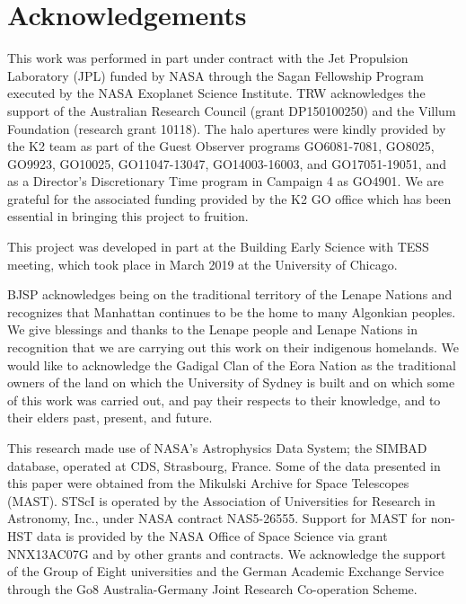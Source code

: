 \documentclass[modern]{aastex62}
\begin{document}
\section*{Acknowledgements} %

This work was performed in part under contract with the Jet Propulsion Laboratory (JPL) funded by NASA through the Sagan Fellowship Program executed by the NASA Exoplanet Science Institute. TRW acknowledges the support of the Australian Research Council (grant DP150100250) and the Villum Foundation (research grant 10118). The halo apertures were kindly provided by the K2 team as part of the Guest Observer programs GO6081-7081, GO8025, GO9923, GO10025, GO11047-13047, GO14003-16003, and GO17051-19051, and as a Director's Discretionary Time program in Campaign 4 as GO4901. We are grateful for the associated funding provided by the K2 GO office which has been essential in bringing this project to fruition.

This project was developed in part at the Building Early Science with TESS meeting, which took place in March 2019 at the University of Chicago.

BJSP acknowledges being on the traditional territory of the Lenape Nations and recognizes that Manhattan continues to be the home to many Algonkian peoples. We give blessings and thanks to the Lenape people and Lenape Nations in recognition that we are carrying out this work on their indigenous homelands. We would like to acknowledge the Gadigal Clan of the Eora Nation as the traditional owners of the land on which the University of Sydney is built and on which some of this work was carried out, and pay their respects to their knowledge, and to their elders past, present, and future.
%

This research made use of NASA's Astrophysics Data System; the SIMBAD database, operated at CDS, Strasbourg, France. Some of the data presented in this paper were obtained from the Mikulski Archive for Space Telescopes (MAST). STScI is operated by the Association of Universities for Research in Astronomy, Inc., under NASA contract NAS5-26555. Support for MAST for non-HST data is provided by the NASA Office of Space Science via grant NNX13AC07G and by other grants and contracts. We acknowledge the support of the Group of Eight universities and the German Academic Exchange Service through the Go8 Australia-Germany Joint Research Co-operation Scheme. 

\end{document}
